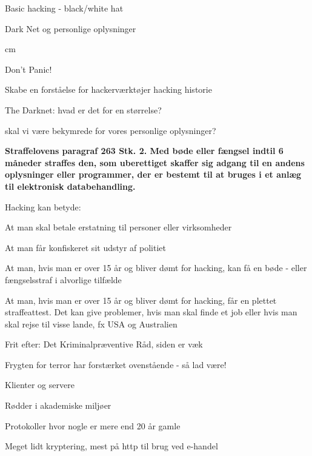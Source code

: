 \documentclass[20pt,landscape,a4paper]{foils}
\begin{document}

\mytitlepage
{Basic hacking - black/white hat

Dark Net og personlige oplysninger}



 cm


\centerline{\color{titlecolor}\LARGE Don't Panic!}

\begin{list1}
\item Skabe en forståelse for hackerværktøjer hacking historie
\item The Darknet: hvad er det for en størrelse?
\item skal vi være bekymrede for vores personlige oplysninger?
\end{list1}




{\bfseries Straffelovens paragraf 263 Stk. 2. Med bøde eller fængsel
  indtil 6 måneder
straffes den, som uberettiget skaffer sig adgang til en andens
oplysninger eller programmer, der er bestemt til at bruges i et anlæg
til elektronisk databehandling.}

Hacking kan betyde:
\begin{list2}
\item At man skal betale erstatning til personer eller virksomheder
\item At man får konfiskeret sit udstyr af politiet
\item At man, hvis man er over 15 år og bliver dømt for hacking, kan
  få en bøde - eller fængselsstraf i alvorlige tilfælde
\item At man, hvis man er over 15 år og bliver dømt for hacking, får
en plettet straffeattest. Det kan give problemer, hvis man skal finde
et job eller hvis man skal rejse til visse lande, fx USA og
Australien
\item Frit efter:  Det
  Kriminalpræventive Råd, siden er væk
\item Frygten for terror har forstærket ovenstående - så lad være!
\end{list2}





\begin{list1}
\item Klienter og servere
\item Rødder i akademiske miljøer
\item Protokoller hvor nogle er mere end 20 år gamle
\item Meget lidt kryptering, mest på http til brug ved e-handel
\end{list1}
\end{document}
